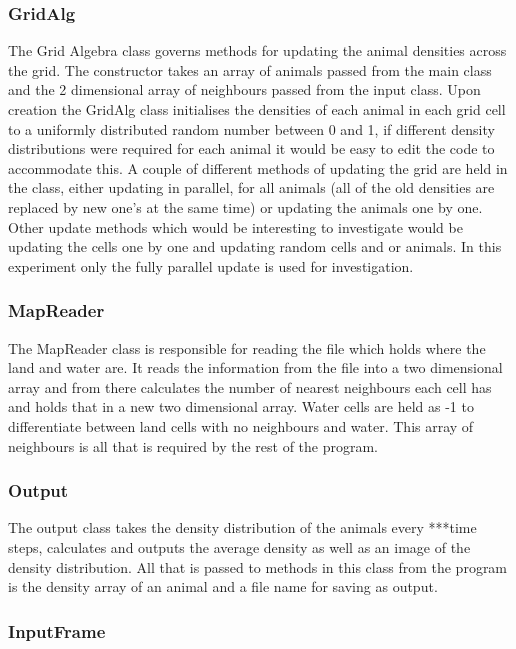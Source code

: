 \documentclass[11pt]{report}
\begin{document}
\subsubsection{GridAlg}
\label{sec:GridAlg}
The Grid Algebra class governs methods for updating the animal densities across the  grid. The constructor takes an array of animals passed from the main class and the 2 dimensional array of neighbours passed from the input class. Upon creation the GridAlg class initialises the densities of each animal in each grid cell to a uniformly distributed random number between 0 and 1, if different density distributions were required for each animal it would be easy to edit the code to accommodate this. A couple of different methods of updating the grid are held in the class, either updating in parallel, for all animals (all of the old densities are replaced by new one's at the same time) or updating the animals one by one. Other update methods which would be interesting to investigate would be updating the cells one by one and updating random cells and or animals. In this experiment only the fully parallel update is used for investigation.

\subsubsection{MapReader}
\label{sec:MapReader}
The MapReader class is responsible for reading the file which holds where the land and water are. It reads the information from the file into a two dimensional array and from there calculates the number of nearest neighbours each cell has and holds that in a new two dimensional array. Water cells are held as -1 to differentiate between land cells with no neighbours and water. This array of neighbours is all that is required by the rest of the program.



\subsubsection{Output}
\label{sec:Output}
The output class takes the density distribution of the animals every ***time steps, calculates and outputs the average density as well as an image of the density distribution. All that is passed to methods in this class from the program is the density array of an animal and a file name for saving as output. 

\subsubsection{InputFrame}
\label{sec:InputFrame}
\end{document}
